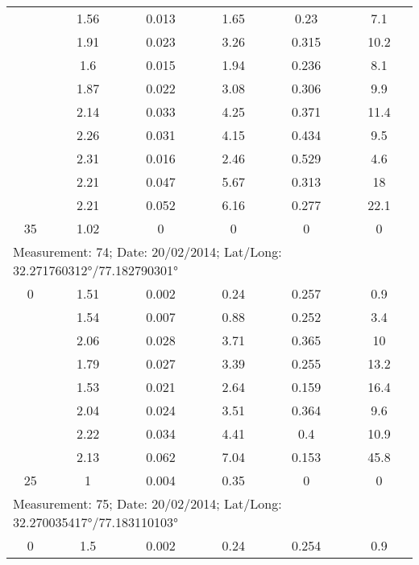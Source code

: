 \begin{longtable}{cccccc}
		& 1.56  & 0.013 & 1.65  & 0.23  & 7.1 \\
		
		& 1.91  & 0.023 & 3.26  & 0.315 & 10.2 \\
		
		& 1.6   & 0.015 & 1.94  & 0.236 & 8.1 \\
		
		& 1.87  & 0.022 & 3.08  & 0.306 & 9.9 \\
		
		& 2.14  & 0.033 & 4.25  & 0.371 & 11.4 \\
		
		& 2.26  & 0.031 & 4.15  & 0.434 & 9.5 \\
		
		& 2.31  & 0.016 & 2.46  & 0.529 & 4.6 \\
		
		& 2.21  & 0.047 & 5.67  & 0.313 & 18 \\
		
		& 2.21  & 0.052 & 6.16  & 0.277 & 22.1 \\
		
		35    & 1.02  & 0     & 0     & 0     & 0 \\
		\multicolumn{6}{l}{Measurement: 74; Date: 20/02/2014;
			Lat/Long: 32.271760312°/77.182790301°} \\		
		\midrule
		0     & 1.51  & 0.002 & 0.24  & 0.257 & 0.9 \\
		
		& 1.54  & 0.007 & 0.88  & 0.252 & 3.4 \\
		
		& 2.06  & 0.028 & 3.71  & 0.365 & 10 \\
		
		& 1.79  & 0.027 & 3.39  & 0.255 & 13.2 \\
		
		& 1.53  & 0.021 & 2.64  & 0.159 & 16.4 \\
		
		& 2.04  & 0.024 & 3.51  & 0.364 & 9.6 \\
		
		& 2.22  & 0.034 & 4.41  & 0.4   & 10.9 \\
		
		& 2.13  & 0.062 & 7.04  & 0.153 & 45.8 \\
		
		25    & 1     & 0.004 & 0.35  & 0     & 0 \\
		\midrule
		\multicolumn{6}{l}{Measurement: 75; Date: 20/02/2014;
			Lat/Long: 32.270035417°/77.183110103°} \\		
		\midrule
		0     & 1.5   & 0.002 & 0.24  & 0.254 & 0.9 \\
		

\end{longtable}
